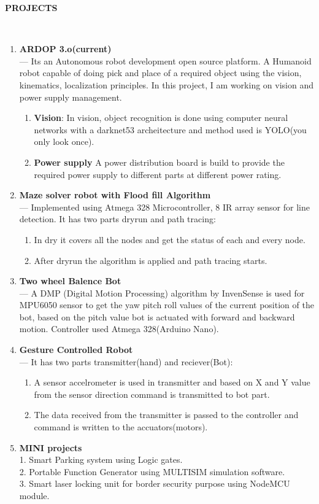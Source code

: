 \documentclass[a4paper,10pt]{article}
\newcommand{\lsep}{-0.5cm}
\newcommand{\resheading}[1]{{\small \colorbox{mygrey}{\begin{minipage}{0.975\textwidth}{\textbf{#1 \vphantom{p\^{E}}}}\end{minipage}}}}
\begin{document}
\resheading{\textbf{PROJECTS} }\\[\lsep]
\begin{enumerate}
\item\noindent\textbf{ARDOP 3.o(current)}\\
\indent --- Its an Autonomous robot development open source platform. A Humanoid robot capable of doing pick and place of a required object using the vision, kinematics, localization principles. In this project, I am working on vision and power supply management.
\begin{enumerate}
\item\noindent\textbf{Vision}: In vision, object recognition is done using computer neural networks with a darknet53 archeitecture and method used is YOLO(you only look once).
\item\noindent\textbf{Power supply} A power distribution board is build to provide the required power supply to different parts at different power rating.
\end{enumerate}
\item \noindent \textbf{Maze solver robot with Flood fill Algorithm}\\
\indent --- Implemented using Atmega 328 Microcontroller, 8 IR array sensor for line detection. It has two parts dryrun and path tracing:
\begin{enumerate}
\item In dry it covers all the nodes and get the status of each and every node.
\item  After dryrun the algorithm is applied and path tracing starts.
\end{enumerate} 

\item\noindent\textbf{Two wheel Balence Bot}\\
\indent --- A DMP (Digital Motion Processing) algorithm by InvenSense is used for MPU6050 sensor to get the yaw pitch roll values of the current position of the bot, based on the pitch value bot is actuated with forward and backward motion. Controller used Atmega 328(Arduino Nano).

\item\noindent\textbf{Gesture Controlled Robot}\\
\indent --- It has two parts transmitter(hand) and reciever(Bot):
\begin{enumerate}
\item  A sensor accelrometer is used in transmitter and based on X and Y value from the sensor direction command is transmitted to bot part.
\item The data received from the transmitter is passed to the controller and command is written to the accuators(motors).
\end{enumerate}
\item\noindent\textbf{MINI projects}\\
1. Smart Parking system using Logic gates.\\
2. Portable Function Generator using MULTISIM simulation software.\\
3. Smart laser locking unit for border security purpose using NodeMCU module.
\end{enumerate}
\end{document}
